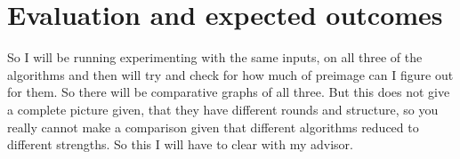 \documentclass[12pt]{artikel3}                  %
\begin{document}
\section{Evaluation and expected outcomes}
So I will be running experimenting with the same inputs, on all three of the algorithms and then will try and check for 
how much of preimage can I figure out for them. So there will be comparative graphs of all three. But this does not give
a complete picture given, that they have different rounds and structure, so you really cannot make a comparison given
that different algorithms reduced to different strengths. So this I will have to clear with my advisor.

\clearpage



\end{document}

